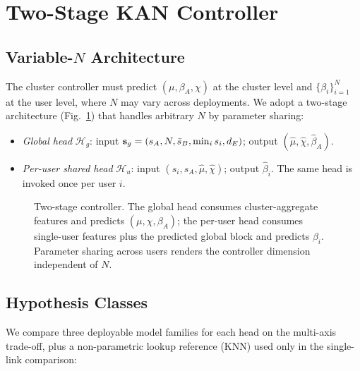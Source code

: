 \section{Two-Stage KAN Controller}\label{sec:controller}

\subsection{Variable-$N$ Architecture}

The cluster controller must predict $(\mu, \beta_A, \chi)$ at the cluster level and $\{\beta_i\}_{i=1}^N$ at the user level, where $N$ may vary across deployments. We adopt a two-stage architecture (Fig.~\ref{fig:ctrl}) that handles arbitrary $N$ by parameter sharing:

\begin{itemize}
\item \emph{Global head} $\mathcal{H}_g$: input $\mathbf{s}_g = (s_A, N, \bar s_B, \min_i s_i, d_E)$; output $(\hat\mu, \hat\chi, \hat\beta_A)$.
\item \emph{Per-user shared head} $\mathcal{H}_u$: input $(s_i, s_A, \hat\mu, \hat\chi)$; output $\hat\beta_i$. The same head is invoked once per user $i$.
\end{itemize}

\begin{figure}[!htbp]
\centering
\resizebox{\columnwidth}{!}{}
\caption{Two-stage controller. The global head consumes cluster-aggregate features and predicts $(\mu, \chi, \beta_A)$; the per-user head consumes single-user features plus the predicted global block and predicts $\beta_i$. Parameter sharing across users renders the controller dimension independent of $N$.}
\label{fig:ctrl}
\end{figure}

\subsection{Hypothesis Classes}

We compare three deployable model families for each head on the multi-axis trade-off, plus a non-parametric lookup reference (KNN) used only in the single-link comparison:

